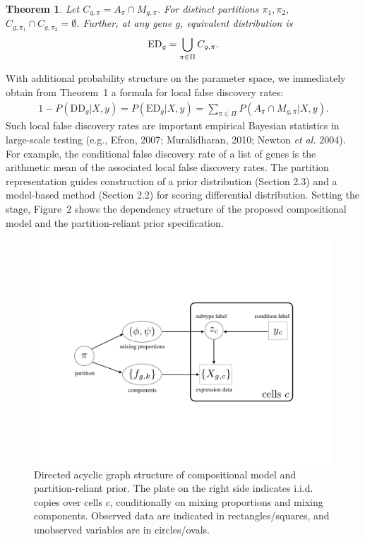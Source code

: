 \documentclass[aoas,preprint]{imsart}
\newtheorem{theorem}{Theorem}
\begin{document}
\begin{theorem}  Let $C_{g,\pi} = A_\pi\cap M_{g, \pi}$.  For distinct 
partitions $\pi_1,\pi_2$, $C_{g,\pi_1} \cap C_{g,\pi_2} = \emptyset$. Further,
 at any gene $g$, equivalent distribution is
\begin{eqnarray*}
{\rm{ED}}_g = \bigcup_{\pi \in \Pi} C_{g,\pi}.
\end{eqnarray*}
\end{theorem}
With additional 
probability structure on the parameter space,  we immediately obtain from Theorem~1 
a formula for local false discovery rates:
\begin{align}
\label{eq:lfdr}
1-P(\text{DD}_g|X,y) = 
 P(\text{ED}_g|X,y) = \sum_{\pi \in \Pi} P\left(A_\pi \cap M_{g,\pi} |X,y \right).
\end{align}
Such local false discovery rates are important empirical Bayesian 
statistics in large-scale testing (e.g., Efron, 2007; Muralidharan, 2010; Newton 
{\em et al.} 2004).  For example, the conditional false discovery rate of a list of genes 
is the arithmetic mean of the associated local false discovery rates.  
The partition representation guides construction of a prior distribution (Section 2.3) and a 
model-based method (Section 2.2) for scoring  differential distribution.   Setting the stage, 
Figure~2 shows the dependency structure of 
the proposed compositional model and the partition-reliant prior specification.

\begin{figure}[h!]
\includegraphics[trim={4cm 6cm 4cm 6cm}, clip, width=5in]{Figs/dag.png}
  \caption{Directed acyclic graph structure of compositional 
model and partition-reliant prior. The plate on the right side indicates i.i.d.
copies over cells $c$, conditionally on mixing proportions and mixing components.
 Observed data are indicated in rectangles/squares, and unobserved variables
are in circles/ovals. }
  \label{fig:2}
\end{figure}
\end{document}

